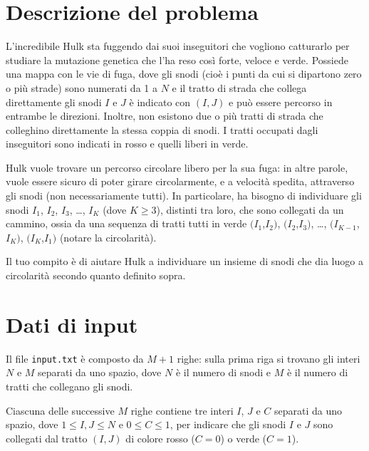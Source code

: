 \documentclass[a4paper,11pt]{article}
\begin{document}
\vspace{0.5cm}



\section*{Descrizione del problema}
  
L'incredibile Hulk sta fuggendo dai suoi inseguitori che vogliono
catturarlo per studiare la mutazione genetica che l'ha reso
così forte, veloce e verde.  Possiede una mappa con le vie di fuga,
dove gli snodi (cioè i punti da cui si dipartono zero o più
strade) sono numerati da 1 a $N$ e il tratto di strada che
collega direttamente gli snodi $I$ e $J$ è indicato con
$(I,J)$ e può essere percorso in entrambe le
direzioni. Inoltre, non esistono due o più tratti di strada che
colleghino direttamente la stessa coppia di snodi. I tratti occupati
dagli inseguitori sono indicati in rosso e quelli liberi in verde.

Hulk vuole trovare un percorso circolare libero per la sua fuga: in
altre parole, vuole essere sicuro di poter girare circolarmente, e a
velocità spedita, attraverso gli snodi (non necessariamente
tutti).  In particolare, ha bisogno di individuare gli
snodi $I_{1}$, $I_{2}$,
$I_{3}$, …,
$I_{K}$ (dove $K ≥ 3$), distinti tra
loro, che sono collegati da un cammino, ossia da una sequenza di
tratti tutti in verde
$(I_{1}$,$I_{2}$$)$,
$(I_{2}$,$I_{3}$$)$,
…,
$(I_{K-1}$,$I_{K}$$)$,
$(I_{K}$,$I_{1}$$)$ (notare
la circolarità).

Il tuo compito è di aiutare Hulk a individuare un insieme di
snodi che dia luogo a circolarità secondo quanto definito
sopra.


\section*{Dati di input}
  
Il file \texttt{input.txt} è composto da $M+1$
righe: sulla prima riga si trovano gli interi $N$ e
$M$ separati da uno spazio, dove $N$ è il
numero di snodi e $M$ è il numero di tratti che
collegano gli snodi.

Ciascuna delle successive $M$ righe contiene tre interi
$I$, $J$ e $C$ separati da uno spazio,
dove $1 ≤ I, J ≤ N$ e $0 ≤ C ≤ 1$,
per indicare che gli snodi
$I$ e $J$ sono collegati dal tratto $(I,J)$
di colore rosso ($C=0$) o verde ($C=1$).
\end{document}
